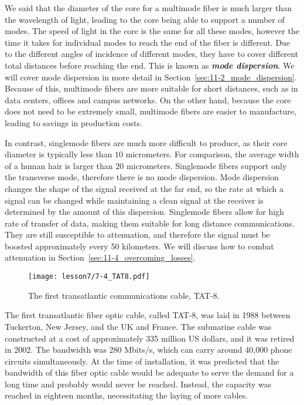We said that the diameter of the core for a multimode fiber is much larger than the wavelength of light, leading to the core being able to support a number of modes.
The speed of light in the core is the same for all these modes, however the time it takes for individual modes to reach the end of the fiber is different.
Due to the different angles of incidence of different modes, they have to cover different total distances before reaching the end.
This is known as \textbf{\emph{mode dispersion}}.
We will cover mode dispersion in more detail in Section~\ref{sec:11-2_mode_dispersion}.
Because of this, multimode fibers are more suitable for short distances, such as in data centers, offices and campus networks.
On the other hand, because the core does not need to be extremely small, multimode fibers are easier to manufacture, leading to savings in production costs.

In contrast, singlemode fibers are much more difficult to produce, as their core diameter is typically less than $10$ micrometers.
For comparison, the average width of a human hair is larger than $20$ micrometers.
Singlemode fibers support only the transverse mode, therefore there is no mode dispersion.
Mode dispersion changes the shape of the signal received at the far end, so the rate at which a signal can be changed while maintaining a clean signal at the receiver is determined by the amount of this dispersion.
Singlemode fibers allow for high rate of transfer of data, making them suitable for long distance communications.
They are still susceptible to attenuation, and therefore the signal must be boosted approximately every 50 kilometers.
We will discuss how to combat attenuation in Section~\ref{sec:11-4_overcoming_losses}.

\begin{figure}[t]
    \centering
    \texttt{[image: lesson7/7-4\_TAT8.pdf]}
    \caption[TAT-8.]{The first transatlantic communications cable, TAT-8.}
    \label{fig:7-4_TAT8}
\end{figure}

The first transatlantic fiber optic cable, called TAT-8, was laid in 1988 between Tuckerton, New Jersey, and the UK and France.
The submarine cable was constructed at a cost of approximately 335 million US dollars, and it was retired in 2002.
The bandwidth was 280 Mbits/s, which can carry around 40,000 phone circuits simultaneously. At the time of installation, it was predicted that the bandwidth of this fiber optic cable would be adequate to serve the demand for a long time and probably would never be reached.
Instead, the capacity was reached in eighteen months, necessitating the laying of more cables.


